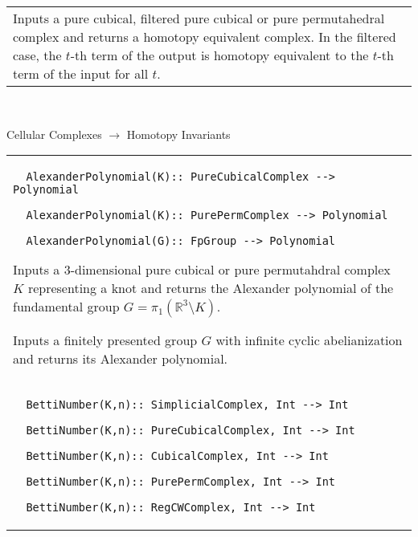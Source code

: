 \documentclass[a4paper,11pt]{report}
\begin{document}
{\begin{center}
\begin{tabular}{|l|}
 Inputs a pure cubical, filtered pure cubical or pure permutahedral complex and
returns a homotopy equivalent complex. In the filtered case, the $t$-th term of the output is homotopy equivalent to the $t$-th term of the input for all $t$. \\
\end{tabular}\\[2mm]
\end{center}

 Cellular Complexes $\longrightarrow$ Homotopy Invariants \begin{center}
\begin{tabular}{|l|} \index{AlexanderPolynomial} 
\begin{verbatim}  AlexanderPolynomial(K):: PureCubicalComplex --> Polynomial
\end{verbatim}
 
\begin{verbatim}  AlexanderPolynomial(K):: PurePermComplex --> Polynomial
\end{verbatim}
 
\begin{verbatim}  AlexanderPolynomial(G):: FpGroup --> Polynomial
\end{verbatim}


 

 Inputs a $3$-dimensional pure cubical or pure permutahdral complex $K$ representing a knot and returns the Alexander polynomial of the fundamental
group $G = \pi_1(\mathbb R^3\setminus K)$. 

 Inputs a finitely presented group $G$ with infinite cyclic abelianization and returns its Alexander polynomial. \\
 \index{BettiNumber} 
\begin{verbatim}  BettiNumber(K,n):: SimplicialComplex, Int --> Int
\end{verbatim}
 
\begin{verbatim}  BettiNumber(K,n):: PureCubicalComplex, Int --> Int
\end{verbatim}
 
\begin{verbatim}  BettiNumber(K,n):: CubicalComplex, Int --> Int
\end{verbatim}
 
\begin{verbatim}  BettiNumber(K,n):: PurePermComplex, Int --> Int
\end{verbatim}
 
\begin{verbatim}  BettiNumber(K,n):: RegCWComplex, Int --> Int
\end{verbatim}
 

\end{tabular}
\end{center}}
\end{document}
